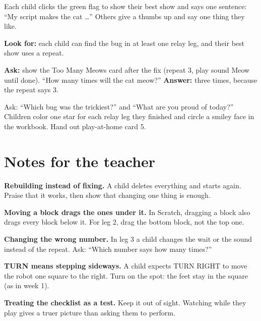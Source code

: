 \begin{teacherscript}
Each child clicks the green flag to show their best show and says one sentence: \enquote{My script makes the cat \ldots} Others give a thumbs up and say one thing they like.
\end{teacherscript}

\begin{formativecheck}
\textbf{Look for:} each child can find the bug in at least one relay leg, and their best show uses a repeat.

\textbf{Ask:} show the Too Many Meows card after the fix (repeat 3, play sound Meow until done). \enquote{How many times will the cat meow?}
\textbf{Answer:} three times, because the repeat says 3.
\end{formativecheck}

\begin{reflection}
Ask: \enquote{Which bug was the trickiest?} and \enquote{What are you proud of today?} Children color one star for each relay leg they finished and circle a smiley face in the workbook. Hand out play-at-home card 5.
\end{reflection}

\section{Notes for the teacher}
\begin{commonmistakes}
  \item \textbf{Rebuilding instead of fixing.} A child deletes everything and starts again. Praise that it works, then show that changing one thing is enough.
  \item \textbf{Moving a block drags the ones under it.} In Scratch, dragging a block also drags every block below it. For leg 2, drag the bottom block, not the top one.
  \item \textbf{Changing the wrong number.} In leg 3 a child changes the wait or the sound instead of the repeat. Ask: \enquote{Which number says how many times?}
  \item \textbf{TURN means stepping sideways.} A child expects TURN RIGHT to move the robot one square to the right. Turn on the spot: the feet stay in the square (as in week 1).
  \item \textbf{Treating the checklist as a test.} Keep it out of sight. Watching while they play gives a truer picture than asking them to perform.
\end{commonmistakes}

